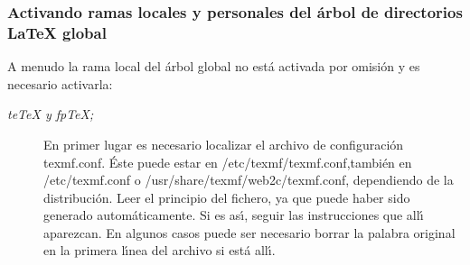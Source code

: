 	\subsubsection{Activando ramas locales y personales del \'arbol de directorios \LaTeX{} global  }

	A menudo la rama local del \'arbol global no est\'a activada por omisi\'on
	y es necesario activarla:
	\begin{description}
	\item[{\itshape te\TeX{} y fp\TeX{};\/}] \mbox{}

	En primer lugar es necesario
	localizar el archivo de configuraci\'on {\ttfamily texmf.conf}. \'Este
	puede estar en {\ttfamily /etc/texmf/texmf.conf},también en 
	{\ttfamily /etc/texmf.conf} o {\ttfamily /usr/share/texmf/web2c/texmf.conf}, dependiendo de la
	distribuci\'on.
	Leer el principio del fichero, ya que puede haber sido generado
	autom\'aticamente. Si es as\'\i{}, seguir las instrucciones que all\'\i{}
	aparezcan.
	En algunos casos puede ser necesario borrar la palabra
	{\ttfamily original} en la primera l\'\i{}nea del archivo si est\'a all\'\i{}.


\end{description}
